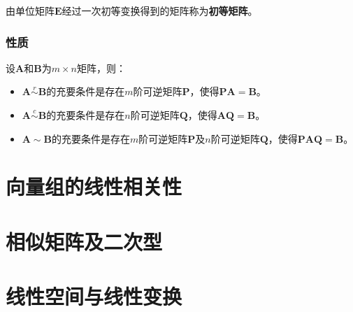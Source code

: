 \documentclass[12pt, a4paper, oneside]{ctexart}
\begin{document}
由单位矩阵$\mathbf{E}$经过一次初等变换得到的矩阵称为\textbf{初等矩阵}。

\subsubsection{性质}

设$\mathbf{A}$和$\mathbf{B}$为$m\times n$矩阵，则：
\begin{itemize}
  \item $\mathbf{A}\overset{r}{\sim}\mathbf{B}$的充要条件是存在$m$阶可逆矩阵$\mathbf{P}$，使得$\mathbf{PA}=\mathbf{B}$。
  \item $\mathbf{A}\overset{c}{\sim}\mathbf{B}$的充要条件是存在$n$阶可逆矩阵$\mathbf{Q}$，使得$\mathbf{AQ}=\mathbf{B}$。
  \item $\mathbf{A}\sim\mathbf{B}$的充要条件是存在$m$阶可逆矩阵$\mathbf{P}$及$n$阶可逆矩阵$\mathbf{Q}$，使得$\mathbf{PAQ}=\mathbf{B}$。
\end{itemize}

\section{向量组的线性相关性}

\section{相似矩阵及二次型}

\section{线性空间与线性变换}
\end{document}
